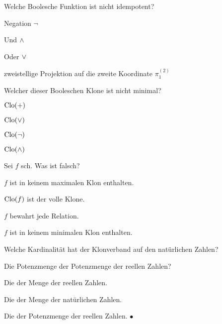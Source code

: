 \documentclass{book}
\begin{document}
\begin{exercise}
Welche Boolesche Funktion ist nicht idempotent?

\begin{tasks}
\item Negation $\neg$
\item Und $\wedge$
\item Oder $\vee$
\item zweistellige Projektion auf die zweite Koordinate $\pi^{(2)}_1$    
\end{tasks}
\end{exercise}


\begin{exercise}
    Welcher dieser Booleschen Klone ist nicht minimal?
    \begin{tasks}
            \item $\mathrm{Clo}(+)$
            \item $\mathrm{Clo}(\vee)$
            \item $\mathrm{Clo}(\neg)$
            \item $\mathrm{Clo}(\wedge)$
    \end{tasks}
\end{exercise}

\begin{exercise}
    Sei $f$ sch. Was ist falsch?
    \begin{tasks}
            \item $f$ ist in keinem maximalen Klon enthalten.
            \item $\mathrm{Clo}(f)$ ist der volle Klone.
            \item $f$ bewahrt jede Relation.
            \item $f$ ist in keinem minimalen Klon enthalten.
    \end{tasks}
\end{exercise}

\begin{exercise}
    Welche Kardinalität hat der Klonverband auf den natürlichen Zahlen?
    \begin{tasks}
            \item Die Potenzmenge der Potenzmenge der reellen Zahlen?
            \item Die der Menge der reellen Zahlen.
            \item Die der Menge der natürlichen Zahlen.
            \item Die der Potenzmenge der reellen Zahlen. $\bullet$
    \end{tasks}
\end{exercise}
\end{document}

